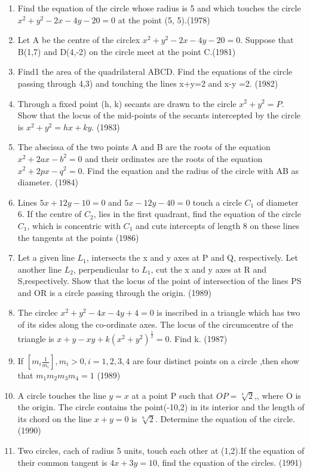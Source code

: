 \documentclass[12pt]{article}
\providecommand{\sbrak}[1]{\ensuremath{{}\left[#1\right]}}
\begin{document}
\begin{enumerate}
\item Find the equation of the circle whose radius is 5 and which touches the circle $x^2+y^2-2x-4y-20=0$ at the point (5, 5).(1978)
\item Let A be the centre of the circlex $x^2+y^2-2x-4y-20=0$. Suppose that B(1,7) and D(4,-2) on the circle meet at the point C.(1981)
\item  Find1 the area of the quadrilateral ABCD. Find the equations of the circle passing through 4,3) and touching the lines x+y=2 and x-y =2. (1982)
\item Through a fixed point (h, k) secants are drawn to the circle $x^2+y^2=P$. Show that the locus of the mid-points of the secants intercepted by the circle is $x^2+y^2= hx +ky$. (1983)
\item The abscissa of the two points A and B are the roots of the equation $x^2+2ax-b^2=0$ and their ordinates are the roots of the equation $x^2+2px-q^2=0$. Find the equation and the radius of the circle with AB as diameter. (1984)
\item Lines $5x+12y-10=0$ and $5x-12y-40=0$ touch a circle $C_1$ of diameter 6. If the centre of $C_2$, lies in the first quadrant, find the equation of the circle $C_1$, which is concentric with $C_1$ and cuts intercepts of length 8 on these lines the tangents at the points (1986)
\item Let a given line $L_1$, intersects the x and y axes at P and Q, respectively. Let another line $L_2$, perpendicular to $L_1$, cut the x and y axes at R and S,respectively. Show that the locus of the point of intersection of the lines PS and OR is a circle passing through the origin. (1989)
\item The circlec $x^2+y^2-4x-4y+4=0$ is inscribed in a triangle which has two of its sides along the co-ordinate axes. The locus of the circumcentre of the triangle is
$x+y-xy+k(x^2+y^2)^{\frac{1}{2}}=0$. Find k. (1987)
\item If $\sbrak{m_i\frac{1}{m_i}},m_i>0,i=1,2,3,4$ are four distinct points on a circle ,then show that $ m_1m_2m_3m_4=1$ (1989)
\item A circle touches the line $y=x$ at a point P such that $OP=\sqrt[4]{2}$,, where O is the origin. The circle contains the point(-10,2) in its interior and the length of its chord on the line $x+y=0$ is $\sqrt[6]{2}$. Determine the equation of the circle. (1990)
\item Two circles, cach of radius 5 units, touch each other at (1,2).If the equation of their common tangent is $4x+3y=10$, find the cquation of the circles. (1991)

\end{enumerate}
\end{document}
